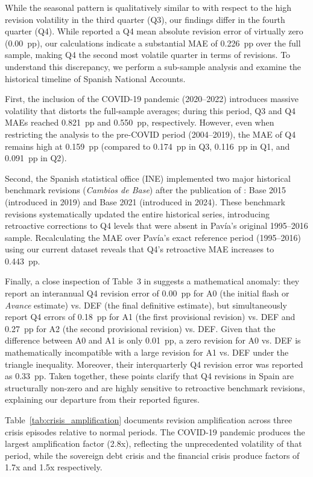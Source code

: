 \documentclass[12pt,a4paper]{article}
\theoremstyle{remark}
\begin{document}
While the seasonal pattern is qualitatively similar to \citet{pavia2018} with respect to the high revision volatility in the third quarter (Q3), our findings differ in the fourth quarter (Q4). While \citet{pavia2018} reported a Q4 mean absolute revision error of virtually zero (0.00~pp), our calculations indicate a substantial MAE of 0.226~pp over the full sample, making Q4 the second most volatile quarter in terms of revisions. To understand this discrepancy, we perform a sub-sample analysis and examine the historical timeline of Spanish National Accounts. 

First, the inclusion of the COVID-19 pandemic (2020--2022) introduces massive volatility that distorts the full-sample averages; during this period, Q3 and Q4 MAEs reached 0.821~pp and 0.550~pp, respectively. However, even when restricting the analysis to the pre-COVID period (2004--2019), the MAE of Q4 remains high at 0.159~pp (compared to 0.174~pp in Q3, 0.116~pp in Q1, and 0.091~pp in Q2). 

Second, the Spanish statistical office (INE) implemented two major historical benchmark revisions (\textit{Cambios de Base}) after the publication of \citet{pavia2018}: Base 2015 (introduced in 2019) and Base 2021 (introduced in 2024). These benchmark revisions systematically updated the entire historical series, introducing retroactive corrections to Q4 levels that were absent in Pavía's original 1995--2016 sample. Recalculating the MAE over Pavía's exact reference period (1995--2016) using our current dataset reveals that Q4's retroactive MAE increases to 0.443~pp. 

Finally, a close inspection of Table~3 in \citet{pavia2018} suggests a mathematical anomaly: they report an interannual Q4 revision error of 0.00~pp for A0 (the initial flash or \textit{Avance} estimate) vs. DEF (the final definitive estimate), but simultaneously report Q4 errors of 0.18~pp for A1 (the first provisional revision) vs. DEF and 0.27~pp for A2 (the second provisional revision) vs. DEF. Given that the difference between A0 and A1 is only 0.01~pp, a zero revision for A0 vs. DEF is mathematically incompatible with a large revision for A1 vs. DEF under the triangle inequality. Moreover, their interquarterly Q4 revision error was reported as 0.33~pp. Taken together, these points clarify that Q4 revisions in Spain are structurally non-zero and are highly sensitive to retroactive benchmark revisions, explaining our departure from their reported figures.

Table~\ref{tab:crisis_amplification} documents revision amplification across three crisis episodes relative to normal periods. The COVID-19 pandemic produces the largest amplification factor (2.8x), reflecting the unprecedented volatility of that period, while the sovereign debt crisis and the financial crisis produce factors of 1.7x and 1.5x respectively.
\end{document}
